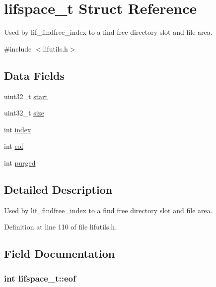 \hypertarget{structlifspace__t}{}\section{lifspace\+\_\+t Struct Reference}
\label{structlifspace__t}


Used by lif\+\_\+findfree\+\_\+index to a find free directory slot and file area.  




{\ttfamily \#include $<$lifutils.\+h$>$}

\subsection*{Data Fields}
\begin{DoxyCompactItemize}
\item 
uint32\+\_\+t \hyperlink{structlifspace__t_a35702daf31460f978a09aef7a42c2671}{start}
\item 
uint32\+\_\+t \hyperlink{structlifspace__t_a0519f0089ed8694cbb2208364c6b31bd}{size}
\item 
int \hyperlink{structlifspace__t_abcca3daca009eca56173dc8577d597da}{index}
\item 
int \hyperlink{structlifspace__t_ad676dc78af3d2cd07c729affab6ec27e}{eof}
\item 
int \hyperlink{structlifspace__t_a53fce276ffb7bb4f8556cc2e7ac76390}{purged}
\end{DoxyCompactItemize}


\subsection{Detailed Description}
Used by lif\+\_\+findfree\+\_\+index to a find free directory slot and file area. 

Definition at line 110 of file lifutils.\+h.



\subsection{Field Documentation}
\subsubsection[{\texorpdfstring{eof}{eof}}]{\setlength{\rightskip}{0pt plus 5cm}int lifspace\+\_\+t\+::eof}\hypertarget{structlifspace__t_ad676dc78af3d2cd07c729affab6ec27e}{}\label{structlifspace__t_ad676dc78af3d2cd07c729affab6ec27e}



